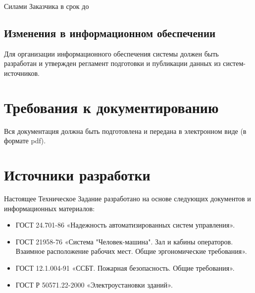\documentclass[a4paper, 12pt]{article}		%
\begin{document}
Силами Заказчика в срок до

\subsection{Изменения в информационном обеспечении}

Для организации информационного обеспечения системы должен быть разработан и утвержден регламент подготовки и публикации данных из систем-источников.

\newpage
\section{Требования к документированию}


Вся документация должна быть подготовлена и передана в электронном виде (в формате pdf).

\newpage
\section{Источники разработки}


Настоящее Техническое Задание разработано на основе следующих документов и информационных материалов:
\begin{itemize}
\item ГОСТ 24.701-86 «Надежность автоматизированных систем управления».
\item ГОСТ 21958-76 «Система "Человек-машина". Зал и кабины операторов. Взаимное расположение рабочих мест. Общие эргономические требования».
\item ГОСТ 12.1.004-91 «ССБТ. Пожарная безопасность. Общие требования».
\item ГОСТ Р 50571.22-2000 «Электроустановки зданий».
\end{itemize}
\end{document}
